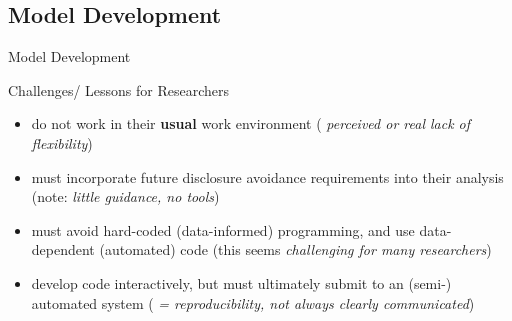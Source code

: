 
\subsection{Model Development}

\begin{frame}{Model Development}
\scalebox{0.1}{\myworkflow}
\begin{block}{Challenges/ Lessons for Researchers}
	\begin{itemize}
		\item do not work in their \textbf{usual} work environment ({\it \color{orange} perceived or real lack of flexibility})
		\item must incorporate future disclosure avoidance requirements into their analysis (note: {\it\color{orange}little guidance, no tools})
		\item must avoid hard-coded (data-informed) programming, and use data-dependent (automated) code (this seems {\it \color{orange} challenging for many researchers})
		\item develop code interactively, but must ultimately submit to an (semi-) automated system ({\it \color{orange} = reproducibility, not always clearly communicated})
	\end{itemize}
	\end{block}
\end{frame}



